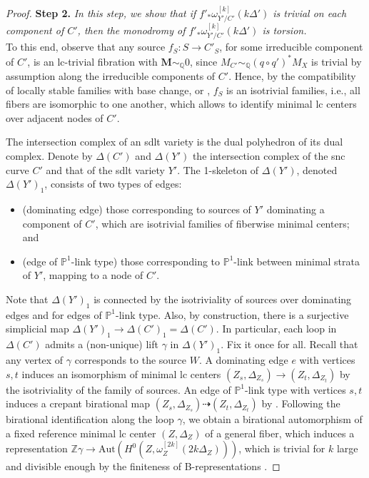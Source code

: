 \documentclass{amsart}
\theoremstyle{definition}
\theoremstyle{remark}
\def\bQ{\mathbb{Q}}
\def\bP{\mathbb{P}}
\newcommand\bfM{{\bf M}}
\def\bfM{\mathbf{M}}
\numberwithin{equation}{section}
\begin{document}
\begin{proof}
\textbf{Step 2.} \emph{In this step, we show that if $f'_* \omega^{[k]}_{Y'/C'}(k\Delta')$
is trivial on each component of $C'$, then the monodromy of $f'_* \omega^{[k]}_{Y'/C'}(k\Delta')$ is torsion.}\\
\noindent To this end, observe that any source $f_S \colon S \to C'_{S}$, for some irreducible component of $C'$, is an lc-trivial fibration with $\bfM \sim_{\bQ} 0$, since $M_{C'} \sim_{\bQ} (q \circ q')^*M_X$ is trivial by assumption along the irreducible components of $C'$. Hence, by 
the compatibility of locally stable families with base change,
\cite[Thm. 3.3 and Prop. 4.4]{Amb05} or \cite[Thm.~A.12]{PZ2020},
$f_S$ is an isotrivial families, i.e., all fibers are isomorphic to one another, which allows to identify minimal lc centers over adjacent nodes of $C'$. 

The intersection complex of an sdlt variety is the dual polyhedron of its dual complex. Denote by $\Delta(C')$ and $\Delta(Y')$ the intersection complex of the snc curve $C'$ and that of the sdlt variety $Y'$. The 1-skeleton of $\Delta(Y')$, denoted $\Delta(Y')_1$, consists of two types of edges: 
\begin{itemize}
\item (dominating edge) those corresponding to sources of $Y'$ dominating a component of $C'$, which are isotrivial families of fiberwise minimal centers; and 
\item (edge of $\bP^1$-link type) those corresponding to $\bP^1$-link between minimal strata of $Y'$, mapping to a node of $C'$.
\end{itemize} 
Note that $\Delta(Y')_1$ is connected by the isotriviality of sources over dominating edges and \cite[Thm.~4.40]{kol13} for edges of $\bP^1$-link type.
Also, by construction, there is a surjective simplicial map $\Delta(Y')_1 \to \Delta(C')_1=\Delta(C')$. In particular, each loop in $\Delta(C')$ admits a (non-unique) lift $\gamma$ in $\Delta(Y')_1$. Fix it once for all. Recall that any vertex of $\gamma$ corresponds to the source $W$. 
A dominating edge $e$ with vertices $s, t$ induces an isomorphism of minimal lc centers 
$(Z_s,\Delta_{Z_s}) \to (Z_t,\Delta_{Z_t})$
by the isotriviality of the family of sources. An edge of $\bP^1$-link type with vertices $s, t$ induces a
crepant
birational map
$(Z_s,\Delta_{Z_s}) \dasharrow (Z_t,\Delta_{Z_t})$
by \cite[Thm.~4.40]{kol13}. Following the birational identification along the loop $\gamma$, we obtain a birational automorphism of a fixed reference minimal lc center
$(Z,\Delta_Z)$ of a general fiber, which induces a representation 
$\mathbb{Z}\gamma \to \mathrm{Aut}(H^0(Z, \omega^{[2k]}_Z(2k\Delta_Z)))$, which is trivial for $k$ large 
and divisible
enough by the finiteness of B-representations \cite[Thm.~1.2]{HX2011}.
\end{proof}
\end{document}
